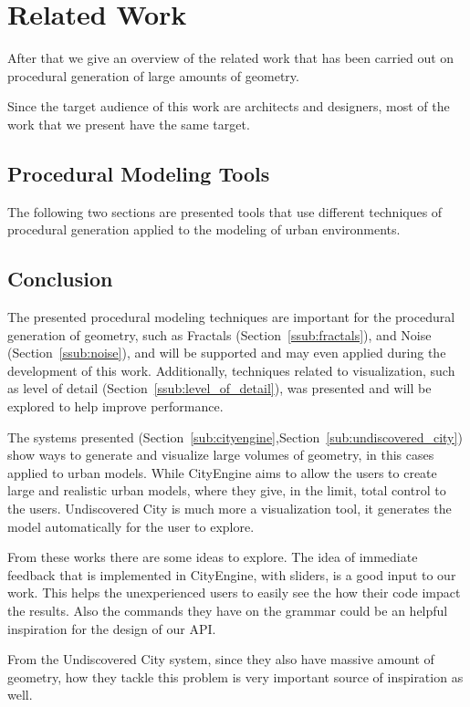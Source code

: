 
% 
% 

\section{Related Work}
\label{sec:related_work}

After that we give an overview of the related work that has been carried out on procedural generation of large amounts of geometry.

Since the target audience of this work are architects and designers, most of the work that we present have the same target.

\subsection{Procedural Modeling Tools} %

The following two sections are presented tools that use different techniques of procedural generation applied to the modeling of urban environments.






\subsection{Conclusion} %
\label{sub:conclusion}

The presented procedural modeling techniques are important for the procedural generation of geometry, such as Fractals (Section~\ref{ssub:fractals}), and Noise (Section~\ref{ssub:noise}), and will be supported and may even applied during the development of this work. Additionally, techniques related to visualization, such as level of detail (Section~\ref{ssub:level_of_detail}), was presented and will be explored to help improve performance.

The systems presented (Section~\ref{sub:cityengine},Section~\ref{sub:undiscovered_city}) show ways to generate and visualize large volumes of geometry, in this cases applied to urban models. While CityEngine \cite{Parish2001} aims to allow the users to create large and realistic urban models, where they give, in the limit, total control to the users. Undiscovered City\cite{Greuter2003} is much more a visualization tool, it generates the model automatically for the user to explore.

From these works there are some ideas to explore. The idea of immediate feedback that is implemented in CityEngine, with sliders, is a good input to our work. This helps the unexperienced users to easily see the how their code impact the results. Also the commands they have on the grammar could be an helpful inspiration for the design of our API.

From the Undiscovered City system, since they also have massive amount of geometry, how they tackle this problem is very important source of inspiration as well.



